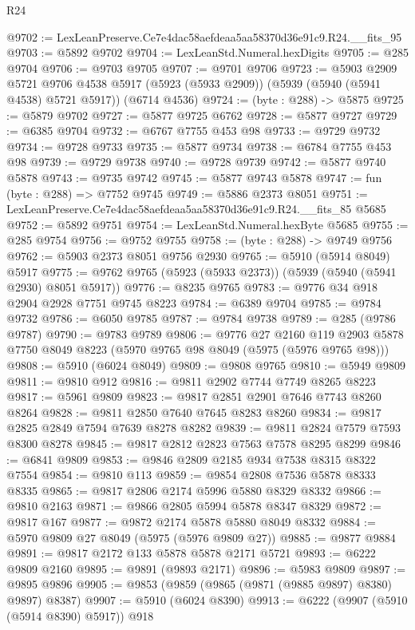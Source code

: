 \begin{lexlean}{R24}
\begin{coremodule}
@9702 := LexLeanPreserve.Ce7e4dac58aefdeaa5aa58370d36e91c9.R24.__fits_95
@9703 := @5892 @9702
@9704 := LexLeanStd.Numeral.hexDigits
@9705 := @285 @9704
@9706 := @9703 @9705
@9707 := @9701 @9706
@9723 := @5903
    @2909
    @5721
    @9706
    @4538
    @5917
    (@5923 (@5933 @2909))
    (@5939 (@5940 (@5941 @4538) @5721 @5917))
    (@6714 @4536)
@9724 := (byte : @288) -> @5875
@9725 := @5879 @9702
@9727 := @5877 @9725 @6762
@9728 := @5877 @9727
@9729 := @6385 @9704
@9732 := @6767 @7755 @453 @98
@9733 := @9729 @9732
@9734 := @9728 @9733
@9735 := @5877 @9734
@9738 := @6784 @7755 @453 @98
@9739 := @9729 @9738
@9740 := @9728 @9739
@9742 := @5877 @9740 @5878
@9743 := @9735 @9742
@9745 := @5877 @9743 @5878
@9747 := fun (byte : @288) => @7752 @9745
@9749 := @5886 @2373 @8051
@9751 := LexLeanPreserve.Ce7e4dac58aefdeaa5aa58370d36e91c9.R24.__fits_85 @5685
@9752 := @5892 @9751
@9754 := LexLeanStd.Numeral.hexByte @5685
@9755 := @285 @9754
@9756 := @9752 @9755
@9758 := (byte : @288) -> @9749 @9756
@9762 := @5903 @2373 @8051 @9756 @2930
@9765 := @5910 (@5914 @8049) @5917
@9775 := @9762 @9765 (@5923 (@5933 @2373)) (@5939 (@5940 (@5941 @2930) @8051 @5917))
@9776 := @8235 @9765
@9783 := @9776 @34 @918 @2904 @2928 @7751 @9745 @8223
@9784 := @6389 @9704
@9785 := @9784 @9732
@9786 := @6050 @9785
@9787 := @9784 @9738
@9789 := @285 (@9786 @9787)
@9790 := @9783 @9789
@9806 := @9776
    @27
    @2160
    @119
    @2903
    @5878
    @7750
    @8049
    @8223
    (@5970 @9765 @98 @8049 (@5975 (@5976 @9765 @98)))
@9808 := @5910 (@6024 @8049)
@9809 := @9808 @9765
@9810 := @5949 @9809
@9811 := @9810 @912
@9816 := @9811 @2902 @7744 @7749 @8265 @8223
@9817 := @5961 @9809
@9823 := @9817 @2851 @2901 @7646 @7743 @8260 @8264
@9828 := @9811 @2850 @7640 @7645 @8283 @8260
@9834 := @9817 @2825 @2849 @7594 @7639 @8278 @8282
@9839 := @9811 @2824 @7579 @7593 @8300 @8278
@9845 := @9817 @2812 @2823 @7563 @7578 @8295 @8299
@9846 := @6841 @9809
@9853 := @9846 @2809 @2185 @934 @7538 @8315 @8322 @7554
@9854 := @9810 @113
@9859 := @9854 @2808 @7536 @5878 @8333 @8335
@9865 := @9817 @2806 @2174 @5996 @5880 @8329 @8332
@9866 := @9810 @2163
@9871 := @9866 @2805 @5994 @5878 @8347 @8329
@9872 := @9817 @167
@9877 := @9872 @2174 @5878 @5880 @8049 @8332
@9884 := @5970 @9809 @27 @8049 (@5975 (@5976 @9809 @27))
@9885 := @9877 @9884
@9891 := @9817 @2172 @133 @5878 @5878 @2171 @5721
@9893 := @6222 @9809 @2160
@9895 := @9891 (@9893 @2171)
@9896 := @5983 @9809
@9897 := @9895 @9896
@9905 := @9853 (@9859 (@9865 (@9871 (@9885 @9897) @8380) @9897) @8387)
@9907 := @5910 (@6024 @8390)
@9913 := @6222 (@9907 (@5910 (@5914 @8390) @5917)) @918

\end{coremodule}
\end{lexlean}
